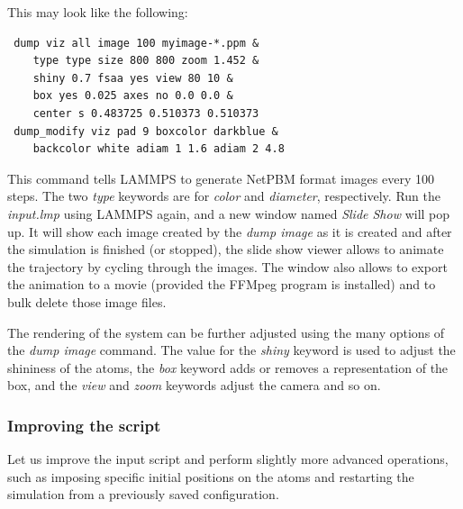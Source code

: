 \documentclass[9pt,tutorial]{livecoms}
\begin{document}
This may look like the following:
{\normalsize
\begin{verbatim}
 dump viz all image 100 myimage-*.ppm &
    type type size 800 800 zoom 1.452 &
    shiny 0.7 fsaa yes view 80 10 &
    box yes 0.025 axes no 0.0 0.0 &
    center s 0.483725 0.510373 0.510373
 dump_modify viz pad 9 boxcolor darkblue &
    backcolor white adiam 1 1.6 adiam 2 4.8
\end{verbatim}
}
This command tells LAMMPS to generate NetPBM format images every 100
steps. The two \textit{type} keywords are for \textit{color} and
\textit{diameter}, respectively.  Run the \textit{input.lmp} using
LAMMPS again, and a new window named \textit{Slide Show} will pop up.
It will show each image created by the \textit {dump image} as it is
created and after the simulation is finished (or stopped), the slide
show viewer allows to animate the trajectory by cycling through the
images.  The window also allows to export the animation to a movie
(provided the FFMpeg program is installed) and to bulk delete those
image files.

The rendering of the system can be further adjusted using the many
options of the \textit{dump image} command.  The value for the
\textit{shiny} keyword is used to adjust the shininess of the atoms, the
\textit{box} keyword adds or removes a representation of the box, and
the \textit{view} and \textit{zoom} keywords adjust the camera and so
on.

\subsubsection{Improving the script}

Let us improve the input script and perform slightly more advanced operations,
such as imposing specific initial positions on the atoms and restarting the
simulation from a previously saved configuration.
\end{document}
